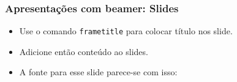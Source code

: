 \begin{frame}
  \frametitle{Apresentações com beamer: Slides}
  \begin{itemize}
		\item Use o comando \texttt{frametitle} para colocar título nos slide.
		\item Adicione então conteúdo ao slides.
		\item A fonte para esse slide parece-se com isso:
  \end{itemize}
\end{frame}

